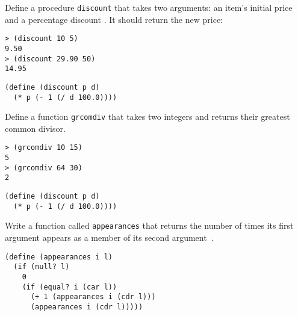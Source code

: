 \begin{questions}
\begin{solution}
\end{solution}


\question
Define a procedure \texttt{discount} that takes two arguments: an item’s initial price and a percentage discount \cite{simplyscheme}.
It should return the new price:
\begin{verbatim}
> (discount 10 5)
9.50
> (discount 29.90 50)
14.95
\end{verbatim}


\begin{solution}
  \begin{verbatim}
(define (discount p d)
  (* p (- 1 (/ d 100.0))))
  \end{verbatim}
\end{solution}


\question
Define a function \texttt{grcomdiv} that takes two integers and returns their greatest common divisor.
\begin{verbatim}
> (grcomdiv 10 15)
5
> (grcomdiv 64 30)
2
\end{verbatim}


\begin{solution}
  \begin{verbatim}
(define (discount p d)
  (* p (- 1 (/ d 100.0))))
  \end{verbatim}
\end{solution}

\question
Write a function called \texttt{appearances} that returns the number of times its first argument appears as a member of its second argument~\cite{simplyscheme}.

\begin{solution}
  \begin{verbatim}
(define (appearances i l)
  (if (null? l)
    0
    (if (equal? i (car l))  
      (+ 1 (appearances i (cdr l)))
      (appearances i (cdr l)))))   
  \end{verbatim}
\end{solution}


\end{questions}
